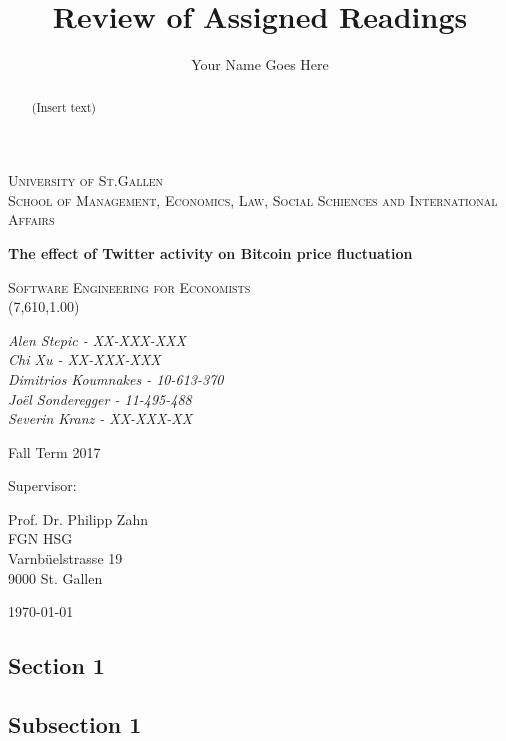 \documentclass[a4paper,american,12pt]{article}
\title{Review of Assigned Readings}
\author{Your Name Goes Here}
\begin{document}
    \begin{titlepage}
        \centering
        {\scshape\LARGE University of St.Gallen \\ \large School of Management, Economics, Law, Social Schiences and International Affairs \par}
        \vspace{2cm}
        {\huge\bfseries The effect of Twitter activity on Bitcoin price fluctuation  \par}
		
        \vspace{1.5cm}
        {\scshape\Large Software Engineering for Economists \\(7,610,1.00) \par}
        \vspace{1.5cm}
        {\itshape\large Alen Stepic - XX-XXX-XXX \\Chi Xu - XX-XXX-XXX \\Dimitrios Koumnakes - 10-613-370 \\Joël Sonderegger - 11-495-488 \\Severin Kranz - XX-XXX-XX \par}
        
        \begin{spacing}{1}
        \vspace{1cm}
        {Fall Term 2017 \par}
        \vspace{1cm}
        Supervisor:\\
        {Prof. Dr. Philipp Zahn\\ FGN HSG\\ Varnbüelstrasse 19\\ 9000 St. Gallen \par} 
        \end{spacing}
        \vfill
        
         {\large \today\par}
    \end{titlepage}
    
    \begin{abstract}
    \begin{spacing}{1.5}
    
  (Insert text)

    \end{spacing}
    
    \end{abstract}

    \clearpage
    \tableofcontents
    
    \clearpage
    
    \listoffigures
    
    \clearpage

\begin{spacing}{1.2}
\cleardoublepage{}
\section{Section 1}

\subsection{Subsection 1}


\end{spacing}
\clearpage

\printbibliography
\end{document}
